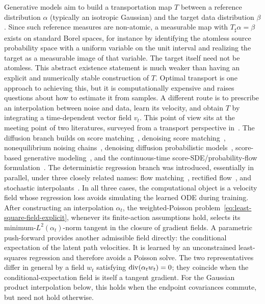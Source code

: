Generative models aim to build a transportation map $T$ between a reference distribution $\alpha$ (typically an isotropic Gaussian) and the target data distribution $\beta$. Since such reference measures are non-atomic, a measurable map with $T_\sharp\alpha=\beta$ exists on standard Borel spaces, for instance by identifying the atomless source probability space with a uniform variable on the unit interval and realizing the target as a measurable image of that variable. The target itself need not be atomless. This abstract existence statement is much weaker than having an explicit and numerically stable construction of $T$.
%
Optimal transport is one approach to achieving this, but it is computationally expensive and raises questions about how to estimate it from samples. A different route is to prescribe an interpolation between noise and data, learn its velocity, and obtain $T$ by integrating a time-dependent vector field $v_t$. This point of view sits at the meeting point of two literatures, surveyed from a transport perspective in~\citet{Peyre2026OptimalDiffusionTransports}. The diffusion branch builds on score matching~\citep{Hyvarinen2005ScoreMatching}, denoising score matching~\citep{Vincent2011DenoisingScoreMatching}, nonequilibrium noising chains~\citep{SohlDickstein2015DeepUnsupervised}, denoising diffusion probabilistic models~\citep{Ho2020DDPM}, score-based generative modeling~\citep{Song2019ScoreMatchingGenerative}, and the continuous-time score-SDE/probability-flow formulation~\citep{Song2021ScoreSDE}. The deterministic regression branch was introduced, essentially in parallel, under three closely related names: flow matching~\citep{Lipman2022FlowMatching}, rectified flow~\citep{Liu2023RectifiedFlow}, and stochastic interpolants~\citep{Albergo2025StochasticInterpolants}. In all three cases, the computational object is a velocity field whose regression loss avoids simulating the learned ODE during training.
%
After constructing an interpolation $\alpha_t$, the weighted-Poisson problem~\eqref{eq:least-square-field-explicit}, whenever its finite-action assumptions hold, selects its minimum-\(L^2(\alpha_t)\)-norm tangent in the closure of gradient fields. A parametric push-forward provides another admissible field directly: the conditional expectation of the latent path velocities. It is learned by an unconstrained least-squares regression and therefore avoids a Poisson solve. The two representatives differ in general by a field \(w_t\) satisfying \(\operatorname{div}(\alpha_t w_t)=0\); they coincide when the conditional-expectation field is itself a tangent gradient. For the Gaussian product interpolation below, this holds when the endpoint covariances commute, but need not hold otherwise.
